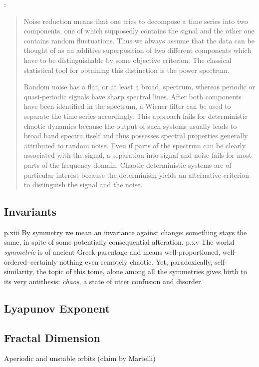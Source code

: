 \documentclass[11pt]{book}
\begin{document}
\citet[p~51]{kantz-schreiber}:
\begin{quotation}
Noise reduction means that one tries to decompose a time series into two components, one of which supposedly contains the signal and the other one contains random fluctuations.
Thus we always assume that the data can be thought of as an additive superposition of two different components which have to be distinguishable by some objective criterion.
The classical statistical tool for obtaining this distinction is the power spectrum.

Random noise has a flat, or at least a broad, spectrum, whereas periodic or quasi-periodic signals have sharp spectral lines.
After both components have been identified in the spectrum, a Wiener filter can be used to separate the time series accordingly.
This approach fails for deterministic chaotic dynamics because the output of such systems usually leads to broad band spectra itself and thus possesses spectral properties generally attributed to random noise.
Even if parts of the spectrum can be clearly associated with the signal, a separation into signal and noise fails for most parts of the frequency domain. Chaotic deterministic systems are of particular interest because the determinism yields an alternative criterion to distinguish the signal and the noise. 
\end{quotation}

\subsection{Invariants}
p.xiii
  By symmetry we mean an invariance against change: something stays the same, in spite of some potentially consequential alteration.
p.xv
  The workd \textit{symmetric} is of ancient Greek parentage and means well-proportioned, well-ordered--certainly nothing even remotely chaotic.
  Yet, paradoxically, self-similarity, the topic of this tome, alone among all the symmetries gives birth to its very antithesis: \textit{chaos},
  a state of utter confusion and disorder.

\subsection{Lyapunov Exponent}

\subsection{Fractal Dimension}

Aperiodic and unstable orbits (claim by Martelli)



\end{document}
